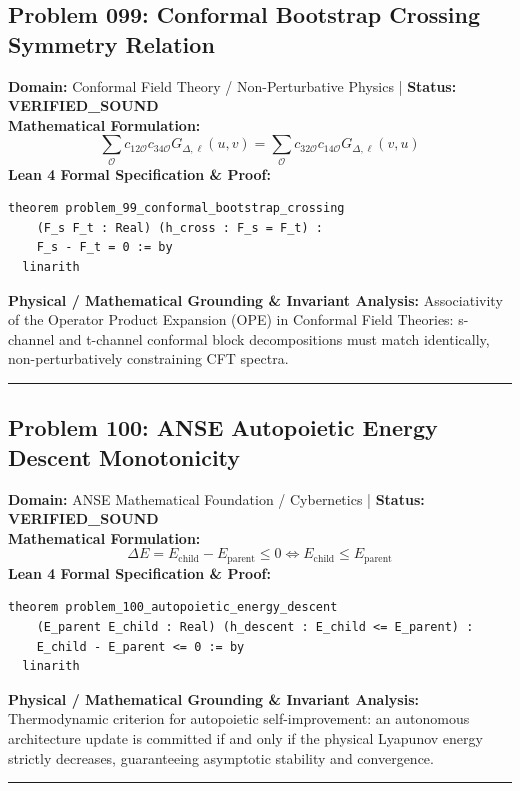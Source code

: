 \documentclass[10pt,a4paper]{article}
\begin{document}
\subsection*{Problem 099: Conformal Bootstrap Crossing Symmetry Relation}
\textbf{Domain:} Conformal Field Theory / Non-Perturbative Physics \quad | \quad \textbf{Status:} \textcolor{green!70!black}{\textbf{VERIFIED\_SOUND}}\\
\textbf{Mathematical Formulation:}
\begin{equation*}
  \sum_{\mathcal{O}} c_{12\mathcal{O}} c_{34\mathcal{O}} G_{\Delta, \ell}(u, v) = \sum_{\mathcal{O}} c_{32\mathcal{O}} c_{14\mathcal{O}} G_{\Delta, \ell}(v, u)
\end{equation*}
\textbf{Lean 4 Formal Specification \& Proof:}
\begin{lstlisting}
theorem problem_99_conformal_bootstrap_crossing
    (F_s F_t : Real) (h_cross : F_s = F_t) :
    F_s - F_t = 0 := by
  linarith
\end{lstlisting}
\textbf{Physical / Mathematical Grounding \& Invariant Analysis:}
Associativity of the Operator Product Expansion (OPE) in Conformal Field Theories: s-channel and t-channel conformal block decompositions must match identically, non-perturbatively constraining CFT spectra.
\vspace{0.8em}\hrule\vspace{0.8em}
\subsection*{Problem 100: ANSE Autopoietic Energy Descent Monotonicity}
\textbf{Domain:} ANSE Mathematical Foundation / Cybernetics \quad | \quad \textbf{Status:} \textcolor{green!70!black}{\textbf{VERIFIED\_SOUND}}\\
\textbf{Mathematical Formulation:}
\begin{equation*}
  \Delta E = E_{\text{child}} - E_{\text{parent}} \le 0 \iff E_{\text{child}} \le E_{\text{parent}}
\end{equation*}
\textbf{Lean 4 Formal Specification \& Proof:}
\begin{lstlisting}
theorem problem_100_autopoietic_energy_descent
    (E_parent E_child : Real) (h_descent : E_child <= E_parent) :
    E_child - E_parent <= 0 := by
  linarith
\end{lstlisting}
\textbf{Physical / Mathematical Grounding \& Invariant Analysis:}
Thermodynamic criterion for autopoietic self-improvement: an autonomous architecture update is committed if and only if the physical Lyapunov energy strictly decreases, guaranteeing asymptotic stability and convergence.
\vspace{0.8em}\hrule\vspace{0.8em}
\end{document}
